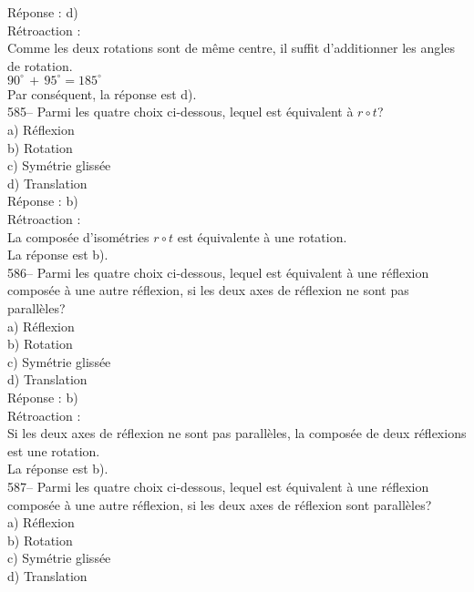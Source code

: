 ﻿\documentclass[letterpaper, 12pt]{article}
\begin{document}
R\'eponse : d)\\

R\'etroaction : \\
Comme les deux rotations sont de m\^eme centre, il suffit d'additionner les
angles de rotation.\\
$90^{\circ}\,+\,95^{\circ}=185^{\circ}$\\
Par cons\'equent, la r\'eponse est d).\\

585-- Parmi les quatre choix ci-dessous, lequel est \'equivalent \`a $r\circ
t$?\\
a) R\'eflexion\\
b) Rotation\\
c) Sym\'etrie gliss\'ee\\
d) Translation\\

R\'eponse : b) \\

R\'etroaction : \\
La compos\'ee d'isom\'etries $r\circ t$ est \'equivalente \`a une
rotation.\\
La r\'eponse est b).\\

586-- Parmi les quatre choix ci-dessous, lequel est \'equivalent \`a une
r\'eflexion compos\'ee \`a une autre r\'eflexion, si les deux axes de
r\'eflexion ne sont pas parall\`eles?\\
a) R\'eflexion\\
b) Rotation\\
c) Sym\'etrie gliss\'ee\\
d) Translation\\

R\'eponse : b) \\

R\'etroaction : \\
Si les deux axes de r\'eflexion ne sont pas parall\`eles, la compos\'ee de
deux r\'eflexions est une rotation.\\
La r\'eponse est b).\\

587-- Parmi les quatre choix ci-dessous, lequel est \'equivalent \`a une
r\'eflexion compos\'ee \`a une autre r\'eflexion, si les deux axes de
r\'eflexion sont parall\`eles?\\
a) R\'eflexion\\
b) Rotation\\
c) Sym\'etrie gliss\'ee\\
d) Translation\\
\end{document}
